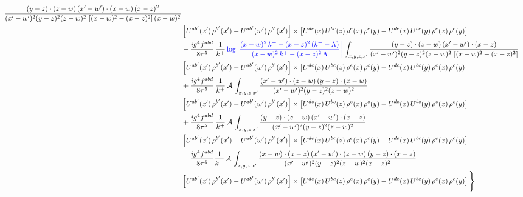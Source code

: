\documentclass[9pt]{article}
\numberwithin{equation}{section}
\begin{document}
\begin{align}
\frac{(y-z)\cdot(z-w)\,(x'-w')\cdot(x-w)\,(x-z)^{2}}{(x'-w')^{2}(y-z)^{2}(z-w)^{2}\,\left[(x-w)^{2}-(x-z)^{2}\right](x-w)^{2}}\notag \\ 
& \left[U^{ab'}(x')\,\rho^{b'}(x')-U^{ab'}(w')\, \rho^{b'}(x')\right]\times \left[U^{de}(x)\,U^{bc}(z)\, \rho^{e}(x)\,\rho^{c}(y)-U^{de}(x)\,U^{bc}(y)\,\rho^{e}(x)\,\rho^{c}(y)\right]\notag \\ & -\frac{ig^{4}f^{abd}}{8\pi^{5}}\,\frac{1}{k^{+}}\,{\color{blue}\log{\left|\frac{(x-w)^{2}\,k^{+}-(x-z)^{2}\,(k^{+}-\Lambda)}{(x-w)^{2}\,k^{+}-(x-z)^{2}\,\Lambda}\right|}}\,\int_{x,y,z,x'}
\frac{(y-z)\cdot(z-w)\,(x'-w')\cdot(x-z)}{(x'-w')^{2}(y-z)^{2}(z-w)^{2}\,\left[(x-w)^{2}-(x-z)^{2}\right]}\notag \\ & \left[U^{ab'}(x')\,\rho^{b'}(x')-U^{ab'}(w')\, \rho^{b'}(x')\right]\times \left[U^{de}(x)\,U^{bc}(z)\, \rho^{e}(x)\,\rho^{c}(y)-U^{de}(x)\,U^{bc}(y)\,\rho^{e}(x)\,\rho^{c}(y)\right]\notag \\ & +\frac{ig^{4}f^{abd}}{8\pi^{5}}\,\frac{1}{k^{+}}\,\mathcal{A}\,\int_{x,y,z,x'}
\frac{(x'-w')\cdot(z-w)\,(y-z)\cdot(x-w)}{(x'-w')^{2}(y-z)^{2}(z-w)^{2}}\notag \\
& \left[U^{ab'}(x')\,\rho^{b'}(x')-U^{ab'}(w')\, \rho^{b'}(x')\right]\times \left[U^{de}(x)\,U^{bc}(z)\, \rho^{e}(x)\,\rho^{c}(y)-U^{de}(x)\,U^{bc}(y)\,\rho^{e}(x)\,\rho^{c}(y)\right]\notag \\ & +\frac{ig^{4}f^{abd}}{8\pi^{5}}\,\frac{1}{k^{+}}\,\mathcal{A}\,\int_{x,y,z,x'}
\frac{(y-z)\cdot(z-w)\,(x'-w')\cdot(x-z)}{(x'-w')^{2}(y-z)^{2}(z-w)^{2}}\notag \\ & \left[U^{ab'}(x')\,\rho^{b'}(x')-U^{ab'}(w')\, \rho^{b'}(x')\right]\times \left[U^{de}(x)\,U^{bc}(z)\, \rho^{e}(x)\,\rho^{c}(y)-U^{de}(x)\,U^{bc}(y)\,\rho^{e}(x)\,\rho^{c}(y)\right]\notag \\ & -\frac{ig^{4}f^{abd}}{8\pi^{5}}\frac{1}{k^{+}}\,\mathcal{A}\,\int_{x,y,z,x'}
\frac{(x-w)\cdot(x-z)\,(x'-w')\cdot(z-w)\,(y-z)\cdot(x-z)}{(x'-w')^{2}(y-z)^{2}(z-w)^{2}(x-z)^{2}}\notag \\ & \left[U^{ab'}(x')\,\rho^{b'}(x')-U^{ab'}(w')\, \rho^{b'}(x')\right]\times \left[U^{de}(x)\,U^{bc}(z)\, \rho^{e}(x)\,\rho^{c}(y)-U^{de}(x)\,U^{bc}(y)\,\rho^{e}(x)\,\rho^{c}(y)\right]\Bigg\}
\end{align}
\end{document}
